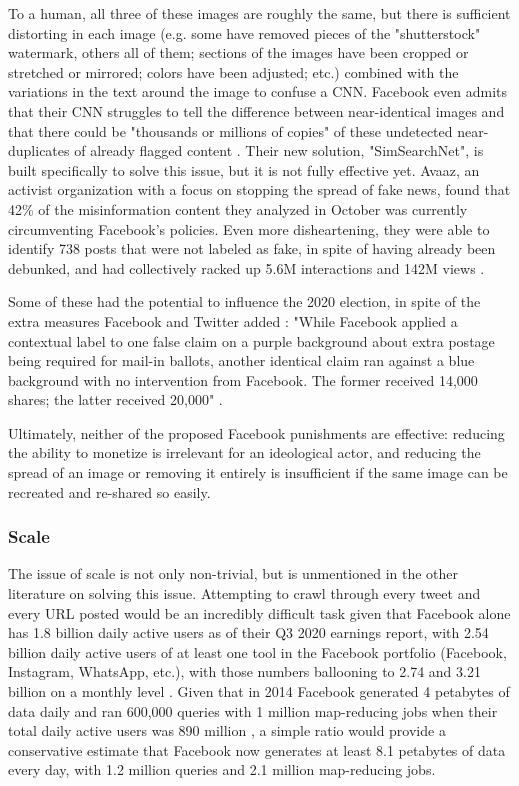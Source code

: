 \documentclass[12pt]{article}
\begin{document}
To a human, all three of these images are roughly the same, but there is sufficient distorting in each image (e.g. some have removed pieces of the "shutterstock" watermark, others all of them; sections of the images have been cropped or stretched or mirrored; colors have been adjusted; etc.) combined with the variations in the text around the image to confuse a CNN. Facebook even admits that their CNN struggles to tell the difference between near-identical images and that there could be "thousands or millions of copies" of these undetected near-duplicates of already flagged content \cite{sumbaly2020using}. Their new solution, "SimSearchNet", is built specifically to solve this issue, but it is not fully effective yet. Avaaz, an activist organization with a focus on stopping the spread of fake news, found that 42\% of the misinformation content they analyzed in October was currently circumventing Facebook's policies. Even more disheartening, they were able to identify 738 posts that were not labeled as fake, in spite of having already been debunked, and had collectively racked up 5.6M interactions and 142M views \cite{schott2020brief}.

Some of these had the potential to influence the 2020 election, in spite of the extra measures Facebook and Twitter added \cite{dean2020facebook}: "While Facebook applied a contextual label to one false claim on a purple background about extra postage being required for mail-in ballots, another identical claim ran against a blue background with no intervention from Facebook. The former received 14,000 shares; the latter received 20,000" \cite{Fung2020facebook}.

Ultimately, neither of the proposed Facebook punishments are effective: reducing the ability to monetize is irrelevant for an ideological actor, and reducing the spread of an image or removing it entirely is insufficient if the same image can be recreated and re-shared so easily.

\subsubsection{Scale}
The issue of scale is not only non-trivial, but is unmentioned in the other literature on solving this issue. Attempting to crawl through every tweet and every URL posted would be an incredibly difficult task given that Facebook alone has 1.8 billion daily active users as of their Q3 2020 earnings report, with 2.54 billion daily active users of at least one tool in the Facebook portfolio (Facebook, Instagram, WhatsApp, etc.), with those numbers ballooning to 2.74 and 3.21 billion on a monthly level \cite{facebook2020q3}. Given that in 2014 Facebook generated 4 petabytes of data daily and ran 600,000 queries with 1 million map-reducing jobs when their total daily active users was 890 million \cite{bronson2015open}, a simple ratio would provide a conservative estimate that Facebook now generates at least 8.1 petabytes of data every day, with 1.2 million queries and 2.1 million map-reducing jobs. 
\end{document}
